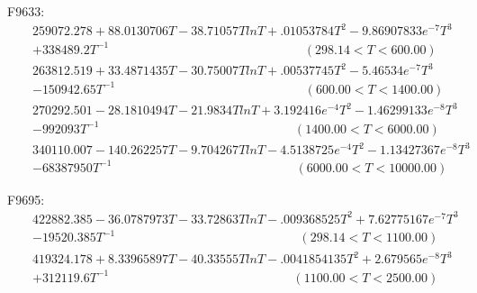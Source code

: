 \documentclass[article]{elsarticle}
\begin{document}
F9633:
\begin{eqnarray}
&&259072.278+88.0130706T-38.71057Tln{T}+.01053784T^2-9.86907833e^{-7}T^{3}\nonumber
~~~~~~~\\&&+338489.2T^{-1}\nonumber~~~~~~~~~~~~~~~~~~~~~~~~~~~~~~~~~~~~~~~~~~~~~~~~~~~~~~~~~~~~~~~~~~~~~~(298.14<T<600.00)\nonumber\\
&&263812.519+33.4871435T-30.75007Tln{T}+.00537745T^2-5.46534e^{-7}T^3\nonumber
~~~~~~~\\&&-150942.65T^{-1}\nonumber~~~~~~~~~~~~~~~~~~~~~~~~~~~~~~~~~~~~~~~~~~~~~~~~~~~~~~~~~~~~~~~~~~~~(600.00<T<1400.00)\nonumber\\
&&270292.501-28.1810494T-21.9834Tln{T}+3.192416e^{-4}T^2-1.46299133e^{-8}T^3\nonumber
~~~~~~~\\&&-992093T^{-1}\nonumber~~~~~~~~~~~~~~~~~~~~~~~~~~~~~~~~~~~~~~~~~~~~~~~~~~~~~~~~~~~~~~~~~~~~~~(1400.00<T<6000.00)\nonumber\\
&&340110.007-140.262257T-9.704267Tln{T}-4.5138725e^{-4}T^2-1.13427367e^{-8}T^3\nonumber
~~~~~~~\\&&-68387950T^{-1}\nonumber~~~~~~~~~~~~~~~~~~~~~~~~~~~~~~~~~~~~~~~~~~~~~~~~~~~~~~~~~~~~~~~~~~(6000.00<T<10000.00)\nonumber
\end{eqnarray}

F9695:
\begin{eqnarray}
&&422882.385-36.0787973T-33.72863Tln{T}-.009368525T^2+7.62775167e^{-7}T^{3}\nonumber
~~~~~~~\\&&-19520.385T^{-1}\nonumber~~~~~~~~~~~~~~~~~~~~~~~~~~~~~~~~~~~~~~~~~~~~~~~~~~~~~~~~~~~~~~~~~~(298.14<T<1100.00)\nonumber\\
&&419324.178+8.33965897T-40.33555Tln{T}-.0041854135T^2+2.679565e^{-8}T^{3}\nonumber
~~~~~~~\\&&+312119.6T^{-1}\nonumber~~~~~~~~~~~~~~~~~~~~~~~~~~~~~~~~~~~~~~~~~~~~~~~~~~~~~~~~~~~~~~~~~~(1100.00<T<2500.00)\nonumber
\end{eqnarray}
\pagebreak
\newpage{}
\newpage


\end{document}
